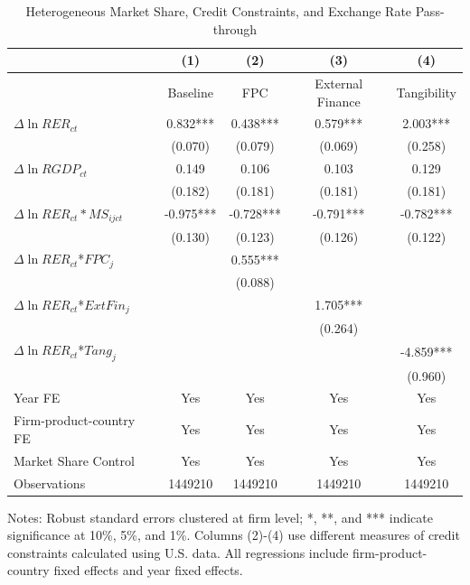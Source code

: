 \begin{table}[htb]
	\centering
	\caption{Heterogeneous Market Share, Credit Constraints, and Exchange Rate Pass-through}
	\begin{threeparttable}
		\begin{tabular}{lcccc}
			\toprule
			& (1)   & (2)   & (3)   & (4) \\
			\midrule
			&  Baseline     & FPC & External Finance& Tangibility        \\
			\midrule
			$\Delta \ln RER_{ct}$ & 0.832*** & 0.438*** & 0.579*** & 2.003*** \\
			& (0.070) & (0.079) & (0.069) & (0.258) \\
			$\Delta \ln RGDP_{ct}$ & 0.149 & 0.106 & 0.103 & 0.129 \\
			& (0.182) & (0.181) & (0.181) & (0.181) \\
			$\Delta \ln RER_{ct}*MS_{ijct}$ & -0.975*** & -0.728*** & -0.791*** & -0.782*** \\
			& (0.130) & (0.123) & (0.126) & (0.122) \\
			$\Delta \ln RER_{ct}$*$FPC_{j}$ &  & 0.555*** &       &  \\
			&  & (0.088) &       &  \\
			$\Delta \ln RER_{ct}$*$ExtFin_{j}$ &   &       & 1.705*** &  \\
			&  &       & (0.264) &  \\
			$\Delta \ln RER_{ct}$*$Tang_{j}$ &   &       &       & -4.859*** \\
			&   &       &       & (0.960) \\
			Year FE  & Yes  & Yes   & Yes   & Yes \\
			Firm-product-country FE & Yes    & Yes   & Yes   & Yes \\
			Market Share Control & Yes   & Yes   & Yes   & Yes \\
			Observations & 1449210  & 1449210 & 1449210 & 1449210 \\
			\bottomrule
		\end{tabular}
		\begin{tablenotes}
			\footnotesize
			\item Notes: Robust standard errors clustered at firm level; *, **, and *** indicate significance at 10\%, 5\%, and 1\%. Columns (2)-(4) use different measures of credit constraints calculated using U.S. data. All regressions include firm-product-country fixed effects and year fixed effects.
		\end{tablenotes}
	\end{threeparttable}
	\label{tab.share}
\end{table}

